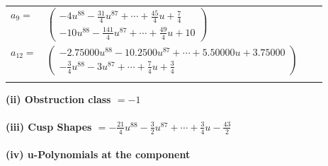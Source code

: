 \documentclass[1p]{elsarticle_modified}
\theoremstyle{definition}
\begin{document}
\begin{tabular}{m{7pt} m{180pt} m{7pt} m{180pt} }
\flushright $a_{9}=$&$\begin{pmatrix}-4 u^{88}-\frac{31}{4} u^{87}+\cdots+\frac{45}{4} u+\frac{7}{4}\\-10 u^{88}-\frac{141}{4} u^{87}+\cdots+\frac{49}{4} u+10\end{pmatrix}$ \\
\flushright $a_{12}=$&$\begin{pmatrix}-2.75000 u^{88}-10.2500 u^{87}+\cdots+5.50000 u+3.75000\\-\frac{3}{4} u^{88}-3 u^{87}+\cdots+\frac{7}{4} u+\frac{3}{4}\end{pmatrix}$\\&\end{tabular}
\flushleft \textbf{(ii) Obstruction class $= -1$}\\~\\
\flushleft \textbf{(iii) Cusp Shapes $= -\frac{21}{4} u^{88}-\frac{3}{2} u^{87}+\cdots+\frac{3}{4} u-\frac{43}{2}$}\\~\\
\newpage\renewcommand{\arraystretch}{1}
\flushleft \textbf{(iv) u-Polynomials at the component}\newline \\
\end{document}
